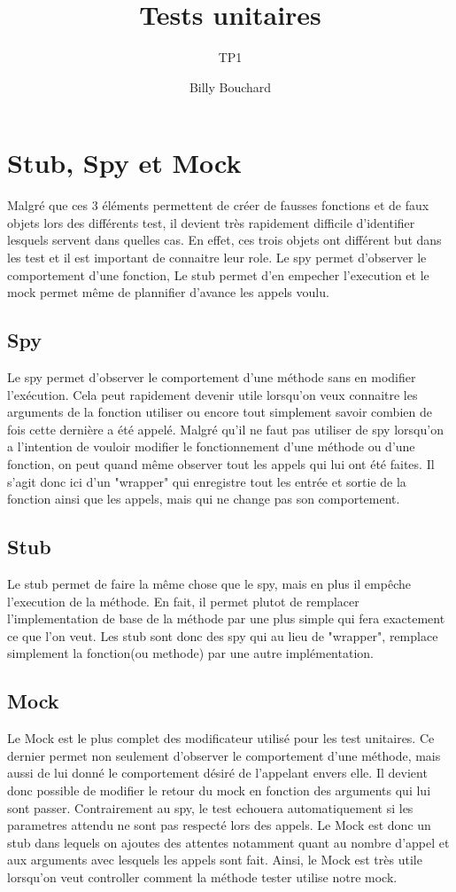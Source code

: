 \documentclass{article}
\title{Tests unitaires}
\subtitle{TP1}
\author{Billy Bouchard}{Jacob Dorais}{}
\begin{document}
\maketitle
\section*{Stub, Spy et Mock}
Malgré que ces 3 éléments permettent de créer de fausses fonctions et de faux objets lors des différents test, il devient très rapidement difficile d'identifier lesquels servent dans quelles cas.
En effet, ces trois objets ont différent but dans les test et il est important de connaitre leur role.
Le spy permet d'observer le comportement d'une fonction,
Le stub permet d'en empecher l'execution et le mock permet même de plannifier d'avance les appels voulu.
\subsection*{Spy}
Le spy permet d'observer le comportement d'une méthode sans en modifier l'exécution.
Cela peut rapidement devenir utile lorsqu'on veux connaitre les arguments de la fonction utiliser ou encore tout simplement savoir combien de fois cette dernière a été appelé.
Malgré qu'il ne faut pas utiliser de spy lorsqu'on a l'intention de vouloir modifier le fonctionnement d'une méthode ou d'une fonction, on peut quand même observer tout les appels qui lui ont été faites.
Il s'agit donc ici d'un "wrapper" qui enregistre tout les entrée et sortie de la fonction ainsi que les appels, mais qui ne change pas son comportement.
\subsection*{Stub}
Le stub permet de faire la même chose que le spy, mais en plus il empêche l'execution de la méthode.
En fait, il permet plutot de remplacer l'implementation de base de la méthode par une plus simple qui fera exactement ce que l'on veut.
Les stub sont donc des spy qui au lieu de "wrapper", remplace simplement la fonction(ou methode) par une autre implémentation.
\subsection*{Mock}
Le Mock est le plus complet des modificateur utilisé pour les test unitaires.
Ce dernier permet non seulement d'observer le comportement d'une méthode, mais aussi de lui donné le comportement désiré de l'appelant envers elle.
Il devient donc possible de modifier le retour du mock en fonction des arguments qui lui sont passer.
Contrairement au spy, le test echouera automatiquement si les parametres attendu ne sont pas respecté lors des appels.
Le Mock est donc un stub dans lequels on ajoutes des attentes notamment quant au nombre d'appel et aux arguments avec lesquels les appels sont fait.
Ainsi, le Mock est très utile lorsqu'on veut controller comment la méthode tester utilise notre mock.
\end{document}
